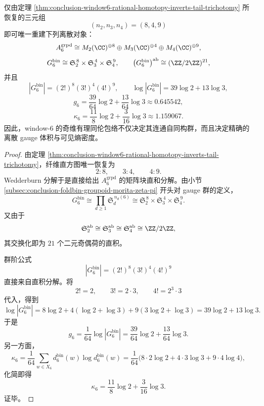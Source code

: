 \begin{corollary}\label{cor:conclusion-window6-rational-homotopy-determines-gauge-volume}
仅由定理 \ref{thm:conclusion-window6-rational-homotopy-inverts-tail-trichotomy} 所恢复的三元组
\[
(n_2,n_3,n_4)=(8,4,9)
\]
即可唯一重建下列离散对象：
\[
A_6^{\mathrm{grpd}}
\cong
M_2(\CC)^{\oplus 8}\oplus M_3(\CC)^{\oplus 4}\oplus M_4(\CC)^{\oplus 9},
\]
\[
G_6^{\mathrm{bin}}
\cong
\mathfrak S_2^{\,8}\times \mathfrak S_3^{\,4}\times \mathfrak S_4^{\,9},
\qquad
\bigl(G_6^{\mathrm{bin}}\bigr)^{\mathrm{ab}}
\cong
(\ZZ/2\ZZ)^{21},
\]
并且
\[
|G_6^{\mathrm{bin}}|=(2!)^8(3!)^4(4!)^9,
\qquad
\log |G_6^{\mathrm{bin}}|=39\log 2+13\log 3,
\]
\[
g_6=\frac{39}{64}\log 2+\frac{13}{64}\log 3\approx 0.645542,
\]
\[
\kappa_6=\frac{11}{8}\log 2+\frac{3}{16}\log 3\approx 1.159067.
\]
因此，window-\(6\) 的奇维有理同伦包络不仅决定其连通自同构群，而且决定精确的离散 gauge 体积与可见熵密度。
\end{corollary}
\begin{proof}
由定理 \ref{thm:conclusion-window6-rational-homotopy-inverts-tail-trichotomy}，纤维直方图唯一恢复为
\[
2:8,\qquad 3:4,\qquad 4:9.
\]
Wedderburn 分解于是直接给出 \(A_6^{\mathrm{grpd}}\) 的矩阵块直和分解。由小节
\ref{subsec:conclusion-foldbin-groupoid-morita-zeta-pi}
开头对 gauge 群的定义，
\[
G_6^{\mathrm{bin}}
\cong
\prod_{d\ge 1}\mathfrak S_d^{\,n_d(6)}
\cong
\mathfrak S_2^{\,8}\times \mathfrak S_3^{\,4}\times \mathfrak S_4^{\,9}.
\]
又由于
\[
\mathfrak S_2^{\mathrm{ab}}\cong \mathfrak S_3^{\mathrm{ab}}\cong \mathfrak S_4^{\mathrm{ab}}\cong \ZZ/2\ZZ,
\]
其交换化即为 \(21\) 个二元奇偶荷的直积。

群阶公式
\[
|G_6^{\mathrm{bin}}|=(2!)^8(3!)^4(4!)^9
\]
直接来自直积分解。将
\[
2!=2,\qquad 3!=2\cdot 3,\qquad 4!=2^3\cdot 3
\]
代入，得到
\[
\log |G_6^{\mathrm{bin}}|
=
8\log 2+4(\log 2+\log 3)+9(3\log 2+\log 3)
=
39\log 2+13\log 3.
\]
于是
\[
g_6=\frac{1}{64}\log|G_6^{\mathrm{bin}}|
=
\frac{39}{64}\log 2+\frac{13}{64}\log 3.
\]
另一方面，
\[
\kappa_6
=
\frac{1}{64}\sum_{w\in X_6}d_6^{\mathrm{bin}}(w)\log d_6^{\mathrm{bin}}(w)
=
\frac{1}{64}\bigl(8\cdot 2\log 2+4\cdot 3\log 3+9\cdot 4\log 4\bigr),
\]
化简即得
\[
\kappa_6=\frac{11}{8}\log 2+\frac{3}{16}\log 3.
\]
证毕。
\end{proof}

